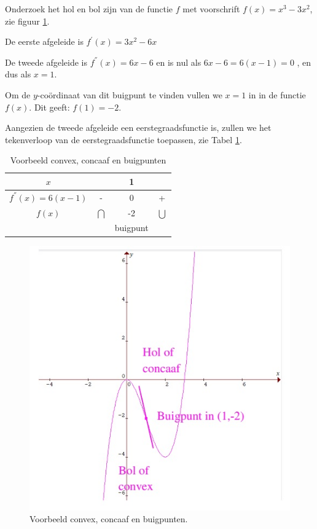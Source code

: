 \begin{voorbeeld}
	Onderzoek het hol en bol zijn van
de functie $f$ met voorschrift $f(x)=x^{3}-3x^{2}$, zie figuur \ref{fig:vb3}.

De eerste afgeleide is $f^{'}(x)=3x^{2}-6x$ 

De tweede afgeleide is $f^{''}(x)=6x-6$ en is nul als $6x-6=6(x-1)=0$
, en dus als $x=1$.

Om de $y$-co\"ordinaat van dit buigpunt te vinden vullen
we $x=1$ in in de functie $f(x)$. Dit geeft: $f(1)=-2$.

Aangezien de tweede afgeleide een eerstegraadsfunctie is,
zullen we het tekenverloop van de eerstegraadsfunctie toepassen, zie Tabel \ref{tab:convex}.

\begin{table}
	\centering
	\begin{tabular}{c||c|c|c}
		$x$ &  & 1 & \tabularnewline
		\hline 
		$f^{''}(x)=6(x-1)$ & - & 0 & +\\
		\hline 
		$f(x)$ & $\bigcap$ & -2 & $\bigcup$\\
		&  & buigpunt & \\
	\end{tabular}
\caption{Voorbeeld convex, concaaf en buigpunten}
\label{tab:convex}
\end{table}

\begin{figure}[h]
\centering{}\includegraphics[width=.7\linewidth]{2_elem_rekenvaardigheden_B/inputs/verloop_vb3.jpg} 
\caption{Voorbeeld convex, concaaf en buigpunten.}
\label{fig:vb3}
\end{figure}

\end{voorbeeld}
